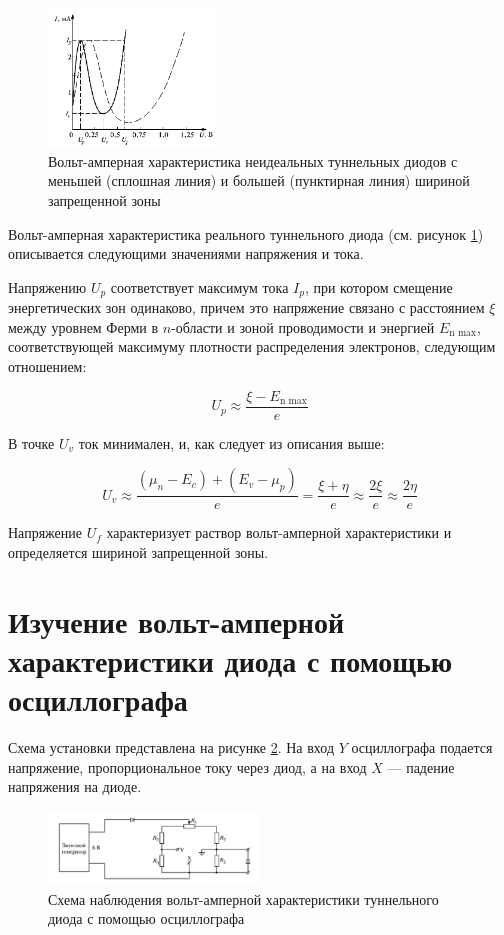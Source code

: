 \documentclass[12pt]{kiarticle}
\begin{document}
	\begin{figure}[h]
		\centering	
		\includegraphics[width=0.4\textwidth]{not_ideal.png}
		\caption{Вольт-амперная характеристика неидеальных туннельных диодов с меньшей (сплошная линия) и большей (пунктирная линия) шириной запрещенной зоны}
		\label{pic:not_ideal}
	\end{figure}  
	
	Вольт-амперная характеристика реального туннельного диода (см. рисунок \ref{pic:not_ideal}) описывается следующими значениями напряжения и тока. 
	
	Напряжению $U_p$ соответствует максимум тока $I_p$, при котором смещение энергетических зон одинаково, причем это напряжение связано с расстоянием $\xi$ между уровнем Ферми в $n$-области и зоной проводимости и энергией $E_\text{n max}$, соответствующей максимуму плотности распределения электронов, следующим отношением: 
	
	\[ U_p \approx \frac{\xi - E_\text{n max}}{e} \]
	
	В точке $U_v$ ток минимален, и, как следует из описания выше:
	
	\[ U_v \approx \frac{(\mu_n - E_c) + (E_v - \mu_p)}{e} = \frac{\xi + \eta}{e} \approx \frac{2\xi}{e} \approx \frac{2\eta}{e} \]
	
	Напряжение $U_f$ характеризует раствор вольт-амперной характеристики и определяется шириной запрещенной зоны. 


	\section{Изучение вольт-амперной характеристики диода с помощью осциллографа}
	
	Схема установки представлена на рисунке \ref{pic:scheme_oscil}. На вход $ Y $ осциллографа подается напряжение, пропорциональное току через диод, а на вход $ X $ --- падение напряжения на диоде.
	
	\begin{figure}[h]
		\centering	
		\includegraphics[width=0.5\textwidth]{scheme_oscil.png}
		\caption{Схема наблюдения вольт-амперной характеристики туннельного диода с помощью осциллографа}
		\label{pic:scheme_oscil}
	\end{figure}
	
\end{document}
